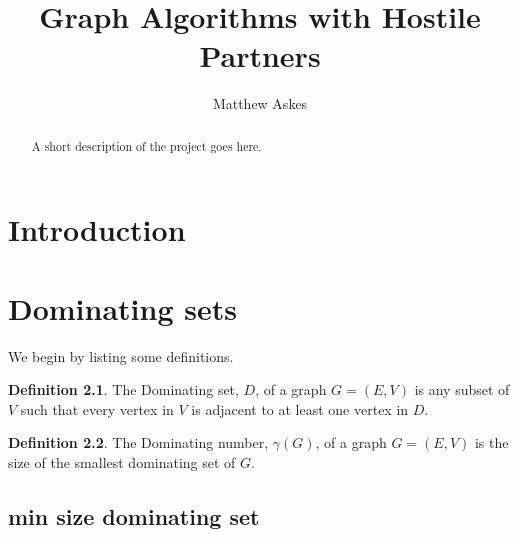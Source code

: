 \documentclass[11pt
              , a4paper
              , twoside
              , openright
              ]{report}
\title{Graph Algorithms with Hostile Partners}
\author{Matthew Askes}
\date{}
\theoremstyle{definition}
\newtheorem*{definition}{Definition}
\begin{document}
\frontmatter



\begin{abstract}

A short description of the project goes here.

\end{abstract}


\maketitle



\tableofcontents



\mainmatter


%
%
%
%
\chapter{Introduction}

\chapter{Dominating sets}

We begin by listing some definitions.

\begin{definition}
    The Dominating set, $D$, of a graph $G=(E,V)$ is any subset of $V$ such that every vertex in $V$ is adjacent to at least one vertex in $D$.
\end{definition}

\begin{definition}
    The Dominating number, $\gamma(G)$, of a graph $G=(E,V)$ is the size of the smallest dominating set of $G$.
\end{definition}

\section{min size dominating set}
\end{document}
